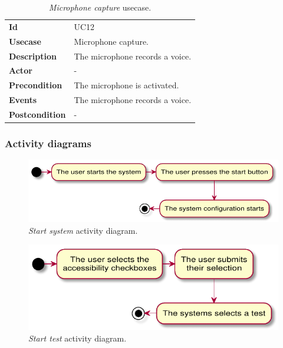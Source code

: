 \begin{table}[h!t]
    \centering
    \caption{\emph{Microphone capture} usecase.}
    \label{tab:uc:microphone}
    \centering
    \begin{tabular}{l | p{80mm}}
        \textbf{Id}            & UC12                            \\
        \textbf{Usecase}       & Microphone capture.             \\
        \textbf{Description}   & The microphone records a voice. \\
        \textbf{Actor}         & -                               \\
        \textbf{Precondition}  & The microphone is activated.    \\
        \textbf{Events}        & The microphone records a voice. \\
        \textbf{Postcondition} & -
    \end{tabular}
\end{table}

\clearpage
\subsubsection{Activity diagrams}
\begin{figure}[h!t]
    \centering
    \includegraphics[scale=0.8]{assets/plantuml/pdf/system.pdf}
    \caption{\emph{Start system} activity diagram.}
    \label{fig:activity:start}
\end{figure}

\begin{figure}[h!t]
    \centering
    \includegraphics[scale=0.8]{assets/plantuml/pdf/test.pdf}
    \caption{\emph{Start test} activity diagram.}
    \label{fig:activity:test}
\end{figure}


